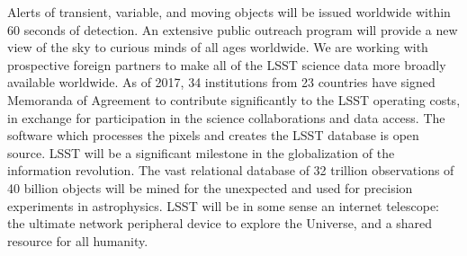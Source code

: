 

Alerts of transient, variable, and moving objects will be issued worldwide within
60 seconds of detection.
An extensive public outreach program will provide a new view of the sky to
curious minds of all ages worldwide.
We are working with prospective foreign partners to make all of the LSST science data
more broadly available worldwide.  As of 2017, 34 institutions from 23 countries
have signed Memoranda of Agreement to contribute significantly to
the LSST operating costs, in exchange for participation in the science collaborations
and data access.  The software which processes the pixels
and creates the LSST database is open source.
LSST will be a significant milestone in the globalization of the information revolution.
The vast relational database of 32 trillion observations of 40 billion objects
will be mined for the unexpected and used for precision experiments in astrophysics.
LSST will be in some sense an internet telescope:
the ultimate network peripheral device to explore the Universe, and
a shared resource for all humanity.
